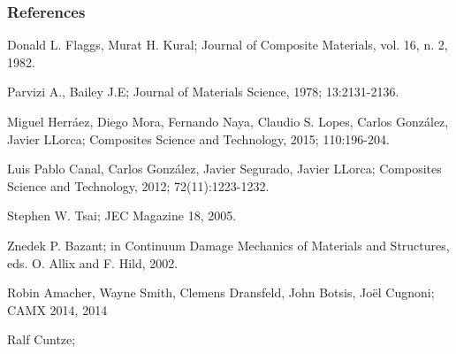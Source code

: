 \documentclass[first,firstsupp,lastsupp,handout,last,hyperref,table]{ETHclass}
\begin{document}
\begin{frame}[allowframebreaks]
  \frametitle{References}
    
  \begin{thebibliography}{10}
    
%
 
    
  \beamertemplatearticlebibitems

Donald L. Flaggs, Murat H. Kural;
\newblock Journal of Composite Materials, vol. 16, n. 2, 1982.

Parvizi A., Bailey J.E;
\newblock Journal of Materials Science, 1978; 13:2131-2136.

Miguel Herr\'aez, Diego Mora, Fernando Naya, Claudio S. Lopes, Carlos Gonz\'alez, Javier LLorca;
\newblock Composites Science and Technology, 2015; 110:196-204.

Luis Pablo Canal, Carlos Gonz\'alez, Javier Segurado, Javier LLorca;
\newblock Composites Science and Technology, 2012; 72(11):1223-1232.

Stephen W. Tsai;
\newblock JEC Magazine 18, 2005.


Znedek P. Bazant;
\newblock in Continuum Damage Mechanics of Materials and Structures, eds. O. Allix and F. Hild, 2002.


Robin Amacher, Wayne Smith, Clemens Dransfeld, John Botsis, Jo\"el Cugnoni;
\newblock CAMX 2014, 2014

Ralf Cuntze;



\end{thebibliography}
\end{frame}
\end{document}
